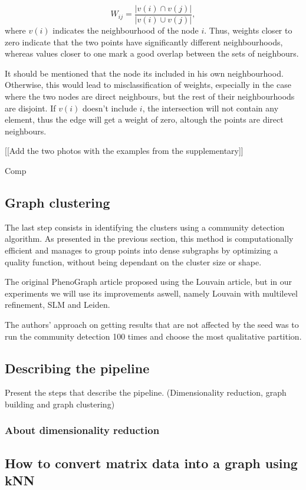     \[ W_{ij} = \frac{|v(i) \cap v(j)|}{|v(i) \cup v(j)|}, \] where $v(i)$ indicates the neighbourhood of the node $i$. Thus, weights closer to zero indicate that the two points have significantly different neighbourhoods, whereas values closer to one mark a good overlap between the sets of neighbours.
    
    It should be mentioned that the node its included in his own neighbourhood. Otherwise, this would lead to misclassification of weights, especially in the case where the two nodes are direct neighbours, but the rest of their neighbourhoods are disjoint. If $v(i)$ doesn't include $i$, the intersection will not contain any element, thus the edge will get a weight of zero, altough the points are direct neighbours. 

    [[Add the two photos with the examples from the supplementary]]


    Comp

    \subsection{Graph clustering}
    The last step consists in identifying the clusters using a community detection algorithm. As presented in the previous section, this method is computationally efficient and manages to group points into dense subgraphs by optimizing a quality function, without being dependant on the cluster size or shape.

    The original PhenoGraph article proposed using the Louvain article, but in our experiments we will use its improvements aswell, namely Louvain with multilevel refinement, SLM and Leiden. 

    The authors' approach on getting results that are not affected by the seed was to run the community detection 100 times and choose the most qualitative partition.

    \subsection{Describing the pipeline}
    Present the steps that describe the pipeline. (Dimensionality reduction, graph building and graph clustering)
    \subsubsection{About dimensionality reduction}
    
    \subsection{How to convert matrix data into a graph using kNN}
